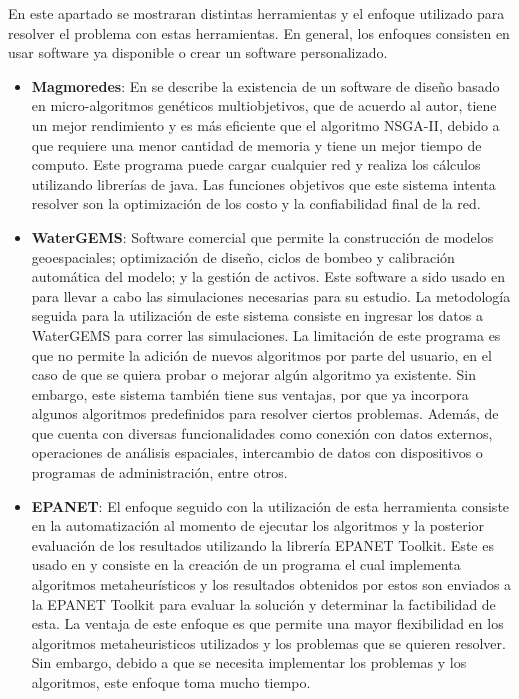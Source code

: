 \documentclass[11pt,letterpaper]{article}
\begin{document}
En este apartado se mostraran distintas herramientas y el enfoque utilizado para resolver el problema con estas herramientas. En general, los enfoques consisten en usar software ya disponible o crear un software personalizado.

\begin{itemize}
	\item \textbf{Magmoredes}: En \cite{Edwin2017} se describe la existencia de un software de diseño basado en micro-algoritmos genéticos multiobjetivos, que de acuerdo al autor, tiene un mejor rendimiento y es más eficiente que el algoritmo NSGA-II, debido a que requiere una menor cantidad de memoria y tiene un mejor tiempo de computo. Este programa puede cargar cualquier red y realiza los cálculos utilizando librerías de java. Las funciones objetivos que este sistema intenta resolver son la optimización de los costo y la confiabilidad final de la red.
	
	\item \textbf{WaterGEMS}: Software comercial que permite la construcción de modelos geoespaciales; optimización de diseño, ciclos de bombeo y calibración automática del modelo; y la gestión de activos. Este software a sido usado en \cite{Mehta2017} para llevar a cabo las simulaciones necesarias para su estudio. La metodología seguida para la utilización de este sistema consiste en ingresar los datos a WaterGEMS para correr las simulaciones. La limitación de este programa es que no permite la adición de nuevos algoritmos por parte del usuario, en el caso de que se quiera probar o mejorar algún algoritmo ya existente. Sin embargo, este sistema también tiene sus ventajas, por que ya incorpora algunos algoritmos predefinidos para resolver ciertos problemas. Además, de que cuenta con diversas funcionalidades como conexión con datos externos, operaciones de análisis espaciales, intercambio de datos con dispositivos o programas de administración, entre otros.
	
	\item \textbf{EPANET}: El enfoque seguido con la utilización de esta herramienta consiste en la automatización al momento de ejecutar los algoritmos y la posterior evaluación de los resultados utilizando la librería EPANET Toolkit. Este es usado en \cite{Doctoral2012} y consiste en la creación de un programa el cual implementa algoritmos metaheurísticos y los resultados obtenidos por estos son enviados a la EPANET Toolkit para evaluar la solución y determinar la factibilidad de esta. La ventaja de este enfoque es que permite una mayor flexibilidad en los algoritmos metaheuristicos utilizados y los problemas que se quieren resolver. Sin embargo, debido a que se necesita implementar los problemas y los algoritmos, este enfoque toma mucho tiempo.
\end{itemize}
\end{document}
